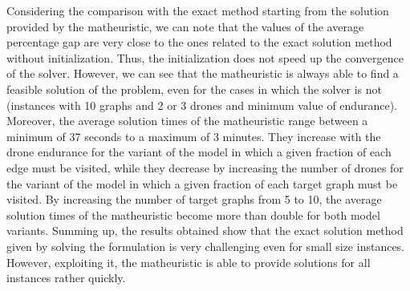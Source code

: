 Considering the comparison with the exact method starting from the solution provided by the matheuristic, we can note that the values of the average percentage gap are very close to the ones related to the exact solution method without initialization. Thus, the initialization does not speed up the convergence of the solver. However, we can see that the matheuristic is always able to find a feasible solution of the problem, even for the cases in which the solver is not (instances with 10 graphs and 2 or 3 drones and minimum value of endurance). 
\noindent
Moreover, the average solution times of the matheuristic range between a minimum of 37 seconds to a maximum of 3 minutes. They increase with the drone endurance for the variant of the model in which a given fraction of each edge must be visited, while they decrease by increasing the number of drones for the variant of the model in which a given fraction of each target graph must be visited. By increasing the number of target graphs from 5 to 10, the average solution times of the matheuristic become more than double for both model variants.
Summing up, the results obtained show that the exact solution method given by solving the formulation is very challenging even for small size instances. However, exploiting it, the matheuristic is able to provide  solutions for all instances rather quickly.

